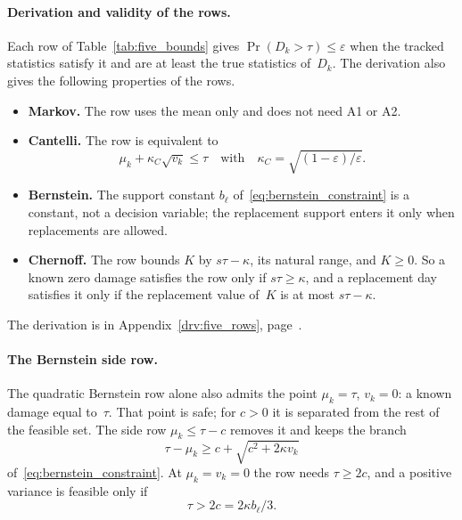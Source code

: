 \documentclass[11pt,a4paper]{article}
\theoremstyle{plain}
\theoremstyle{definition}
\theoremstyle{remark}
\begin{document}
\paragraph{Derivation and validity of the rows.}
Each row of Table~\ref{tab:five_bounds} gives $\Pr(D_k > \tau) \le \varepsilon$ when the tracked statistics satisfy it and are at least the true statistics of~$D_k$.
The derivation also gives the following properties of the rows.
\begin{itemize}
  \item \textbf{Markov.} The row uses the mean only and does not need A1 or A2.
  \item \textbf{Cantelli.} The row is equivalent to
    \begin{equation}
      \mu_k + \kappa_C\sqrt{v_k} \le \tau
      \quad\text{with}\quad
      \kappa_C = \sqrt{(1-\varepsilon)/\varepsilon}.
    \end{equation}
  \item \textbf{Bernstein.} The support constant $b_\ell$ of~\eqref{eq:bernstein_constraint} is a constant, not a decision variable; the replacement support enters it only when replacements are allowed.
  \item \textbf{Chernoff.} The row bounds $K$ by $s\tau - \kappa$, its natural range, and $K \ge 0$.
    So a known zero damage satisfies the row only if $s\tau \ge \kappa$, and a replacement day satisfies it only if the replacement value of~$K$ is at most $s\tau - \kappa$.
\end{itemize}
The derivation is in Appendix~\ref{drv:five_rows}, page~\pageref{drv:five_rows}.

\paragraph{The Bernstein side row.}
The quadratic Bernstein row alone also admits the point $\mu_k = \tau$, $v_k = 0$: a known damage equal to~$\tau$.
That point is safe; for $c > 0$ it is separated from the rest of the feasible set.
The side row $\mu_k \le \tau - c$ removes it and keeps the branch
\begin{equation}
  \tau - \mu_k \ge c + \sqrt{c^2 + 2\kappa v_k}
\end{equation}
of~\eqref{eq:bernstein_constraint}.
At $\mu_k = v_k = 0$ the row needs $\tau \ge 2c$, and a positive variance is feasible only if
\begin{equation}
  \tau > 2c = 2\kappa b_\ell/3.
\end{equation}
\end{document}
